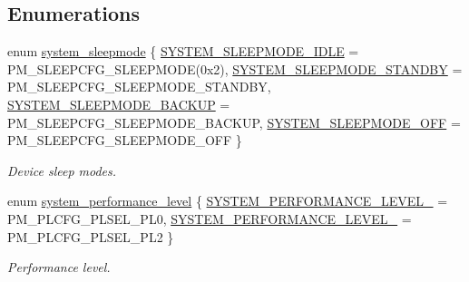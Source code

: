 \subsection*{Enumerations}
\begin{DoxyCompactItemize}
\item 
enum \hyperlink{group__asfdoc__sam0__system__group_ga6a75333c00b88a5da14eb9ba5ead2be1}{system\+\_\+sleepmode} \{ \hyperlink{group__asfdoc__sam0__system__group_gga6a75333c00b88a5da14eb9ba5ead2be1a32cc6cbf4e09dd7ddb48d85ff68318ff}{S\+Y\+S\+T\+E\+M\+\_\+\+S\+L\+E\+E\+P\+M\+O\+D\+E\+\_\+\+I\+D\+L\+E} = P\+M\+\_\+\+S\+L\+E\+E\+P\+C\+F\+G\+\_\+\+S\+L\+E\+E\+P\+M\+O\+D\+E(0x2), 
\hyperlink{group__asfdoc__sam0__system__group_gga6a75333c00b88a5da14eb9ba5ead2be1a446eddfe38bc09277ed1863ffac261e3}{S\+Y\+S\+T\+E\+M\+\_\+\+S\+L\+E\+E\+P\+M\+O\+D\+E\+\_\+\+S\+T\+A\+N\+D\+B\+Y} = P\+M\+\_\+\+S\+L\+E\+E\+P\+C\+F\+G\+\_\+\+S\+L\+E\+E\+P\+M\+O\+D\+E\+\_\+\+S\+T\+A\+N\+D\+B\+Y, 
\hyperlink{group__asfdoc__sam0__system__group_gga6a75333c00b88a5da14eb9ba5ead2be1a360b0bad9094c97ac42939b4e9e20558}{S\+Y\+S\+T\+E\+M\+\_\+\+S\+L\+E\+E\+P\+M\+O\+D\+E\+\_\+\+B\+A\+C\+K\+U\+P} = P\+M\+\_\+\+S\+L\+E\+E\+P\+C\+F\+G\+\_\+\+S\+L\+E\+E\+P\+M\+O\+D\+E\+\_\+\+B\+A\+C\+K\+U\+P, 
\hyperlink{group__asfdoc__sam0__system__group_gga6a75333c00b88a5da14eb9ba5ead2be1a1b54051b5cd49be09cc5d0ef754d3577}{S\+Y\+S\+T\+E\+M\+\_\+\+S\+L\+E\+E\+P\+M\+O\+D\+E\+\_\+\+O\+F\+F} = P\+M\+\_\+\+S\+L\+E\+E\+P\+C\+F\+G\+\_\+\+S\+L\+E\+E\+P\+M\+O\+D\+E\+\_\+\+O\+F\+F
 \}
\begin{DoxyCompactList}\small\item\em Device sleep modes. \end{DoxyCompactList}\item 
enum \hyperlink{group__asfdoc__sam0__system__group_gabb931fb8f68c63f6c16e0ba5c3d93897}{system\+\_\+performance\+\_\+level} \{ \hyperlink{group__asfdoc__sam0__system__group_ggabb931fb8f68c63f6c16e0ba5c3d93897a3fc6c9d26dc0afdb2f1202d26a7a142d}{S\+Y\+S\+T\+E\+M\+\_\+\+P\+E\+R\+F\+O\+R\+M\+A\+N\+C\+E\+\_\+\+L\+E\+V\+E\+L\+\_} = P\+M\+\_\+\+P\+L\+C\+F\+G\+\_\+\+P\+L\+S\+E\+L\+\_\+\+P\+L0, 
\hyperlink{group__asfdoc__sam0__system__group_ggabb931fb8f68c63f6c16e0ba5c3d93897a8a72bbc163e10dbfb113f77ce599cbce}{S\+Y\+S\+T\+E\+M\+\_\+\+P\+E\+R\+F\+O\+R\+M\+A\+N\+C\+E\+\_\+\+L\+E\+V\+E\+L\+\_} = P\+M\+\_\+\+P\+L\+C\+F\+G\+\_\+\+P\+L\+S\+E\+L\+\_\+\+P\+L2
 \}
\begin{DoxyCompactList}\small\item\em Performance level. \end{DoxyCompactList}\item 

\end{DoxyCompactItemize}
